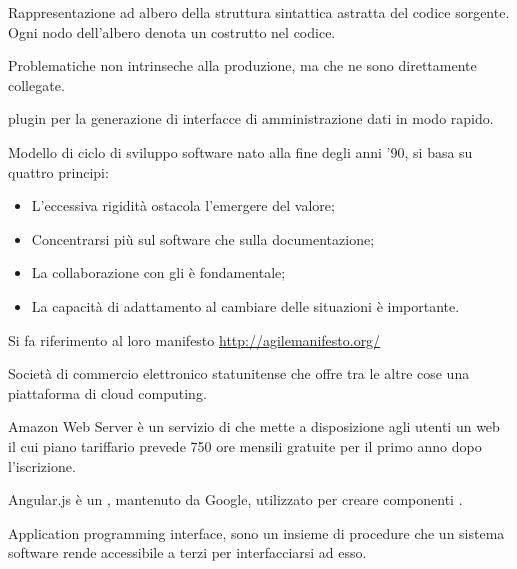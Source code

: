 





\makeFrontPage



\clearpage
\tableofcontents


Rappresentazione ad albero della struttura sintattica astratta del codice sorgente. Ogni nodo dell'albero denota un costrutto nel codice.

Problematiche non intrinseche alla produzione, ma che ne sono direttamente collegate.

 plugin per la generazione di interfacce di amministrazione dati in modo rapido.

Modello di ciclo di sviluppo software nato alla fine degli anni '90, si basa su quattro principi:
\begin{itemize} 
 \item L'eccessiva rigidità ostacola l'emergere del valore;
 \item Concentrarsi più sul software che sulla documentazione;
 \item La collaborazione con gli  è fondamentale;
 \item La capacità di adattamento al cambiare delle situazioni è importante.
\end{itemize} 
Si fa riferimento al loro manifesto \url{http://agilemanifesto.org/}

Società di commercio elettronico statunitense che offre tra le altre cose una piattaforma di cloud computing.

Amazon Web Server è un servizio di  che mette a disposizione agli utenti un web  il cui piano tariffario prevede 750 ore mensili gratuite per il primo anno dopo l'iscrizione.

Angular.js è un   , mantenuto da Google, utilizzato per creare componenti .

Application programming interface, sono un insieme di procedure che un sistema software rende accessibile a terzi per interfacciarsi ad esso.

